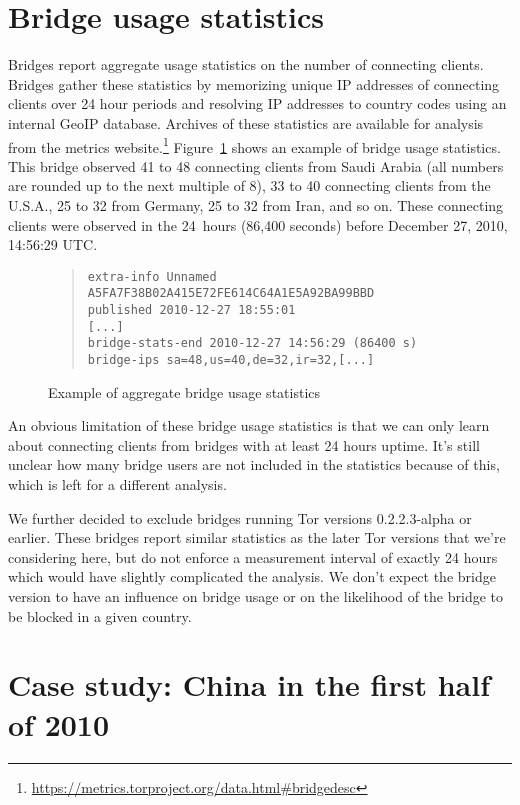 \documentclass{article}
\begin{document}
\section{Bridge usage statistics}

Bridges report aggregate usage statistics on the number of connecting
clients.
Bridges gather these statistics by memorizing unique IP addresses of
connecting clients over 24 hour periods and resolving IP addresses to
country codes using an internal GeoIP database.
Archives of these statistics are available for analysis from the metrics
website.\footnote{\url{https://metrics.torproject.org/data.html#bridgedesc}}
Figure~\ref{fig:bridgeextrainfo} shows an example of bridge usage
statistics.
This bridge observed 41 to 48 connecting clients from Saudi Arabia
(all numbers are rounded up to the next multiple of 8), 33 to 40
connecting clients from the U.S.A., 25 to 32 from Germany, 25 to 32 from
Iran, and so on.
These connecting clients were observed in the 24~hours (86,400 seconds)
before December 27, 2010, 14:56:29 UTC.

\begin{figure}[h]
\begin{quote}
\begin{verbatim}
extra-info Unnamed A5FA7F38B02A415E72FE614C64A1E5A92BA99BBD
published 2010-12-27 18:55:01
[...]
bridge-stats-end 2010-12-27 14:56:29 (86400 s)
bridge-ips sa=48,us=40,de=32,ir=32,[...]
\end{verbatim}
\end{quote}
\caption{Example of aggregate bridge usage statistics}
\label{fig:bridgeextrainfo}
\end{figure}

An obvious limitation of these bridge usage statistics is that we can only
learn about connecting clients from bridges with at least 24 hours uptime.
It's still unclear how many bridge users are not included in the
statistics because of this, which is left for a different analysis.

We further decided to exclude bridges running Tor versions 0.2.2.3-alpha
or earlier.
These bridges report similar statistics as the later Tor versions that
we're considering here, but do not enforce a measurement interval of
exactly 24 hours which would have slightly complicated the analysis.
We don't expect the bridge version to have an influence on bridge usage
or on the likelihood of the bridge to be blocked in a given country.

\section{Case study: China in the first half of 2010}
\end{document}

